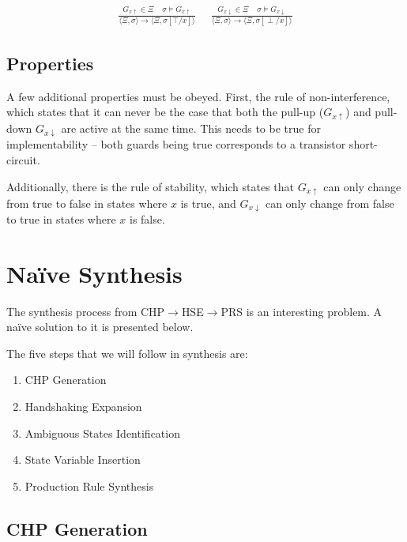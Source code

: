 \documentclass[times,10pt]{article}
\begin{document}
\begin{align*}
\frac{G_{x\uparrow} \in \Xi  \;\;\;\;  \sigma \models G_{x\uparrow} }{\langle \Xi, \sigma \rangle \rightarrow  \langle \Xi , \sigma[\top/x]\rangle} &\;\; 
\frac{G_{x\downarrow} \in \Xi  \;\;\;\;  \sigma \models G_{x\downarrow} }{\langle \Xi, \sigma \rangle \rightarrow \langle \Xi , \sigma[\perp/x]\rangle}
\end{align*}

\subsection{Properties}

A few additional properties must be obeyed.  First, the rule of non-interference, which states that it can never be the case that both the pull-up ($G_{x\uparrow}$) and pull-down $G_{x\downarrow}$ are active at the same time.  This needs to be true for implementability -- both guards being true corresponds to a transistor short-circuit.

Additionally, there is the rule of stability, which states that $G_{x\uparrow}$ can only change from true to false in states where $x$ is true, and $G_{x\downarrow}$ can only change from false to true in states where $x$ is false.

\section{Na\"{i}ve Synthesis} 

The synthesis process from CHP$\rightarrow$HSE$\rightarrow$PRS is an interesting problem.  A na\"{i}ve solution to it is presented below.

The five steps that we will follow in synthesis are:

\begin{enumerate}
\item CHP Generation
\item Handshaking Expansion
\item Ambiguous States Identification
\item State Variable Insertion
\item Production Rule Synthesis
\end{enumerate}

\subsection{CHP Generation}
\end{document}
